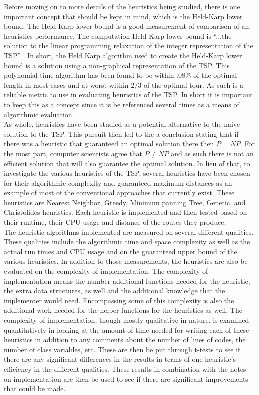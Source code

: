 \documentclass[midd]{thesis}
\newcommand{\tab}{\hspace*{2em}}
\begin{document}
\tab Before moving on to more details of the heuristics being studied, there is one important concept that should be kept in mind, which is the Held-Karp lower bound. The Held-Karp lower bound is a good measurement of comparison of an heuristics performance. The computation Held-Karp lower bound is ``...the solution to the linear programming relaxation of the integer representation of the TSP'' \cite{htspc}. In short, the Held Karp algorithm used to create the Held-Karp lower bound is a solution using a non-graphical representation of the TSP. This polynomial time algorithm has been found to be within .08\% of  the optimal length in most cases and at worst within $2/3$ of the optimal tour. As such is a reliable metric to use in evaluating heuristics of the TSP. In short it is important to keep this as a concept since it is be referenced several times as a means of algorithmic evaluation.\\
\tab As whole, heuristics have been studied as a potential alternative to the naive solution to the TSP. This pursuit then led to the a conclusion stating that if there was a heuristic that guaranteed an optimal solution there then $P = NP$. For the most  part, computer scientists agree that $P \neq NP$ and as such there is not an efficient solution that will also guarantee the optimal solution. In lieu of that, to investigate the various heuristics of the TSP, several heuristics have been chosen for their algorithmic complexity and guaranteed maximum distances as an example of most of the conventional approaches that currently exist. These heuristics are Nearest Neighbor, Greedy, Minimum panning Tree, Genetic, and Christofides heuristics. Each heuristic is implemented and then tested based on their runtime, their CPU usage and distance of the routes they produce.\\ 
\tab The heuristic algorithms implemented are measured on several different qualities. These qualities include the algorithmic time and space complexity as well as the actual run times and CPU usage and on the guaranteed upper bound of the various heuristics. In addition to those measurements, the heuristics are also be evaluated on the complexity of implementation. The complexity of implementation means the number additional functions needed for the heuristic, the extra data structures, as well and the additional knowledge that the implementer would need. Encompassing some of this complexity is also the additional work needed for the helper functions for the heuristics as well. The complexity of implementation, though mostly qualitative in nature, is examined quantitatively in looking at the amount of time needed for writing each of these heuristics in addition to any comments about the number of lines of codes, the number of class variables, etc. These are then be put through t-tests to see if there are any significant differences in the results in terms of one heuristic's efficiency in the different qualities. These results in combination with the notes on implementation are then be used to see if there are significant improvements that could be made.\\
\end{document}

